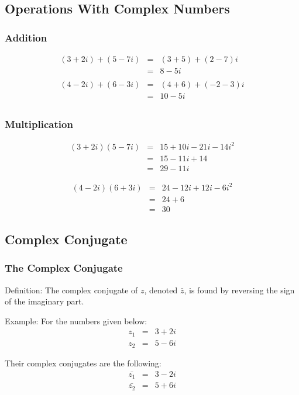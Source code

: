 \subsection{Operations With Complex Numbers}

\begin{frame}
  \frametitle{Addition}

  \begin{eqnarray*}
    (3+2i) + (5-7i) & = & (3+5) + (2-7)i \\
    & = & 8 - 5i\\
    ~ \\
    (4-2i) + (6-3i) & = & (4+6) + (-2-3)i \\
    & = & 10 - 5i \\
  \end{eqnarray*}

\end{frame}

\begin{frame}
  \frametitle{Multiplication}

  \begin{eqnarray*}
    (3+2i)(5-7i) & = & 15 + 10i - 21i - 14 i^2 \\
    & = & 15 - 11i + 14 \\
    & = & 29 - 11 i
  \end{eqnarray*}

  \begin{eqnarray*}
    (4-2i)(6+3i) & = & 24 - 12i + 12 i - 6i^2 \\
    & = & 24 + 6 \\
    & = & 30
  \end{eqnarray*}

\end{frame}


\subsection{Complex Conjugate}

\begin{frame}
  \frametitle{The Complex Conjugate}

  Definition: The complex conjugate of $z$, denoted $\bar{z}$, is
  found by reversing the sign of the imaginary part.
  
  Example:
  For the numbers given below:
  \begin{eqnarray*}
    z_1 & = & 3 + 2i \\
    z_2 & = & 5 - 6i 
  \end{eqnarray*}

  Their complex conjugates are the following:
  \begin{eqnarray*}
    \bar{z_1} & = & 3 - 2i \\
    \bar{z_2} & = & 5 + 6i 
  \end{eqnarray*}


\end{frame}

